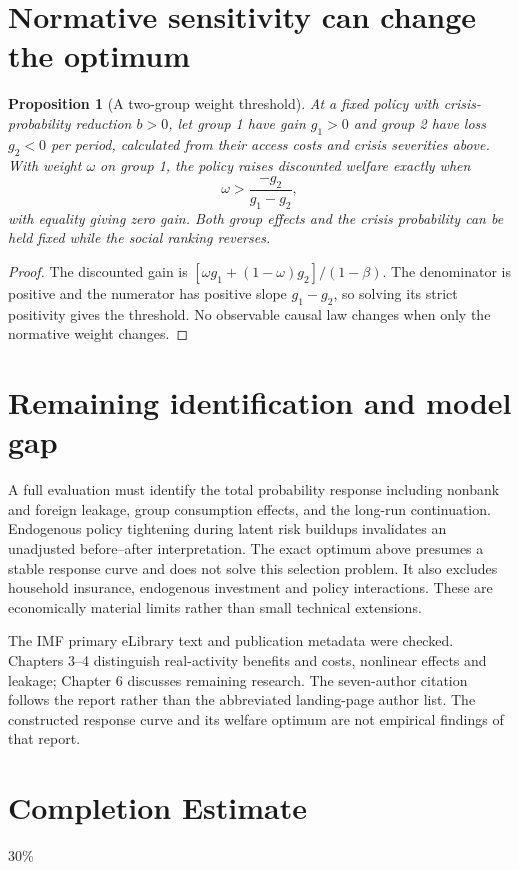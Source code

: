 \documentclass[11pt]{article}
\newtheorem{proposition}[theorem]{Proposition}
\theoremstyle{remark}\newtheorem{remark}[theorem]{Remark}
\begin{document}
\section*{Normative sensitivity can change the optimum}
\begin{proposition}[A two-group weight threshold]
At a fixed policy with crisis-probability reduction $b>0$, let group 1 have gain $g_1>0$ and group 2 have loss $g_2<0$ per period, calculated from their access costs and crisis severities above. With weight $\omega$ on group 1, the policy raises discounted welfare exactly when
\[
 \omega>\frac{-g_2}{g_1-g_2},
\]
with equality giving zero gain. Both group effects and the crisis probability can be held fixed while the social ranking reverses.
\end{proposition}
\begin{proof}
The discounted gain is $[\omega g_1+(1-\omega)g_2]/(1-\beta)$. The denominator is positive and the numerator has positive slope $g_1-g_2$, so solving its strict positivity gives the threshold. No observable causal law changes when only the normative weight changes.
\end{proof}

\section*{Remaining identification and model gap}
A full evaluation must identify the total probability response including nonbank and foreign leakage, group consumption effects, and the long-run continuation. Endogenous policy tightening during latent risk buildups invalidates an unadjusted before--after interpretation. The exact optimum above presumes a stable response curve and does not solve this selection problem. It also excludes household insurance, endogenous investment and policy interactions. These are economically material limits rather than small technical extensions.

The IMF primary eLibrary text and publication metadata were checked. Chapters 3--4 distinguish real-activity benefits and costs, nonlinear effects and leakage; Chapter 6 discusses remaining research. The seven-author citation follows the report rather than the abbreviated landing-page author list. The constructed response curve and its welfare optimum are not empirical findings of that report.

\section{Completion Estimate}
30\%
\end{document}
